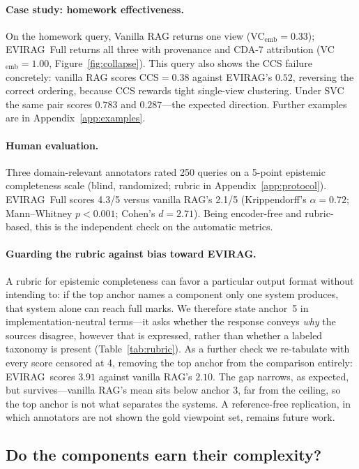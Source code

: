 \documentclass[11pt]{article}
\newcommand{\system}{\textsc{EVIRAG}\xspace}
\begin{document}
\paragraph{Case study: homework effectiveness.}
On the homework query, Vanilla RAG returns one view
(VC$_\text{emb}{=}0.33$); \system\ Full returns all three with provenance and
CDA-7 attribution (VC$_\text{emb}{=}1.00$, Figure~\ref{fig:collapse}).  This
query also shows the CCS failure concretely: vanilla RAG scores CCS${=}0.38$
against \system's $0.52$, reversing the correct ordering, because CCS rewards
tight single-view clustering.  Under SVC the same pair scores $0.783$ and
$0.287$---the expected direction.  Further examples are in
Appendix~\ref{app:examples}.

\paragraph{Human evaluation.}
Three domain-relevant annotators rated 250 queries on a 5-point epistemic
completeness scale (blind, randomized; rubric in Appendix~\ref{app:protocol}).
\system\ Full scores 4.3/5 versus vanilla RAG's 2.1/5 (Krippendorff's
$\alpha{=}0.72$; Mann--Whitney $p{<}0.001$; Cohen's $d{=}2.71$).  Being
encoder-free and rubric-based, this is the independent check on the automatic
metrics.

\paragraph{Guarding the rubric against bias toward \system.}
A rubric for epistemic completeness can favor a particular output format
without intending to: if the top anchor names a component only one system
produces, that system alone can reach full marks.  We therefore state anchor~5
in implementation-neutral terms---it asks whether the response conveys
\emph{why} the sources disagree, however that is expressed, rather than whether
a labeled taxonomy is present (Table~\ref{tab:rubric}).  As a further check we
re-tabulate with every score censored at 4, removing the top anchor from the
comparison entirely: \system\ scores $3.91$ against vanilla RAG's $2.10$.  The
gap narrows, as expected, but survives---vanilla RAG's mean sits below anchor 3,
far from the ceiling, so the top anchor is not what separates the systems.  A
reference-free replication, in which annotators are not shown the gold viewpoint
set, remains future work.

\subsection{Do the components earn their complexity?}
\label{sec:controls}
\end{document}

